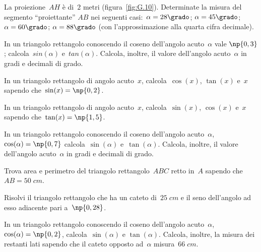 \begin{multicols}{2}
\begin{esercizio}
\label{ese:G.14}
La proiezione~$AH$ è di~$2$ metri (figura~\ref{fig:G.10}). Determinate la misura del segmento ``proiettante'' $AB$ nei seguenti casi:~$\alpha=28\grado$;
$\alpha=45\grado$; $\alpha=60\grado$; $\alpha=88\grado$ (con l'approssimazione alla quarta cifra decimale).
\end{esercizio}

\begin{esercizio}
\label{ese:G.15}
In un triangolo rettangolo conoscendo il coseno dell'angolo acuto~$\alpha$ vale $\np{0,3}$; calcola~$sin(\alpha)$ e~$tan(\alpha)$.
Calcola, inoltre, il valore dell'angolo acuto~$\alpha$ in gradi e decimali di grado.
\end{esercizio}

\begin{esercizio}
\label{ese:G.16}
In un triangolo rettangolo di angolo acuto~$x$, calcola~$\cos(x)$, $\tan(x)$ e~$x$ sapendo che~$\sin(x)=\np{0,2}$.
\end{esercizio}

\begin{esercizio}
\label{ese:G.17}
In un triangolo rettangolo di angolo acuto~$x$, calcola~$\sin(x)$, $\cos(x)$ e~$x$ sapendo che~$\tan(x)=\np{1,5}$.
\end{esercizio}

\begin{esercizio}
\label{ese:G.18}
In un triangolo rettangolo conoscendo il coseno dell'angolo acuto~$\alpha$, $\cos(\alpha)=\np{0,7}$ calcola~$\sin(\alpha)$ e~$\tan(\alpha)$.
Calcola, inoltre, il valore dell'angolo acuto~$\alpha$ in gradi e decimali di grado.
\end{esercizio}

\begin{esercizio}
\label{ese:G.19}
Trova area e perimetro del triangolo rettangolo~$ABC$ retto in~$A$ sapendo che~$AB=50\;\unit{cm}$.
\end{esercizio}

\begin{esercizio}
\label{ese:G.20}
Risolvi il triangolo rettangolo che ha un cateto di~$25\;\unit{cm}$ e il seno dell'angolo ad esso adiacente pari a~$\np{0,28}$.
\end{esercizio}

\begin{esercizio}
\label{ese:G.21}
In un triangolo rettangolo conoscendo il coseno dell'angolo acuto~$\alpha$, $\cos(\alpha)=\np{0,2}$, calcola~$\sin(\alpha)$ e
$\tan(\alpha)$. Calcola, inoltre, la misura dei restanti lati sapendo che il cateto opposto ad~$\alpha$ misura~$66\;\unit{cm}$.
\end{esercizio}
\end{multicols}

